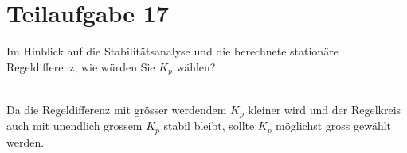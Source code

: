 \section{Teilaufgabe 17}
\begin{aufgabe}
    Im Hinblick auf die Stabilitätsanalyse und die berechnete stationäre 
    Regeldifferenz, wie würden Sie $K_p$ wählen?
\end{aufgabe}
\\
Da die Regeldifferenz mit grösser werdendem $K_p$ kleiner wird und der 
Regelkreis auch mit unendlich grossem $K_p$ stabil bleibt, sollte $K_p$ 
möglichst gross gewählt werden. 
